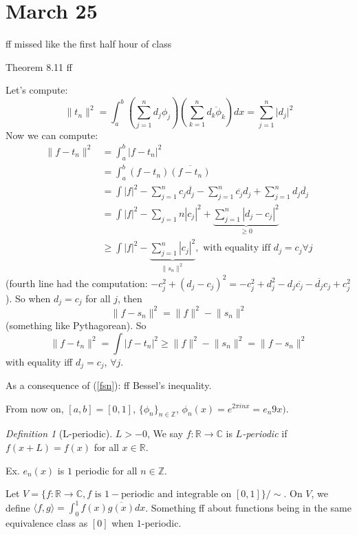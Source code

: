 \documentclass{article}
\theoremstyle{plain}
\theoremstyle{remark}
\newtheorem{definition}{Definition}
\newcommand{\Z}{{\mathbb Z}}
\newcommand{\R}{{\mathbb R}}
\newcommand{\C}{{\mathbb C}}
\begin{document}
\section{March 25}
ff missed like the first half hour of class

Theorem 8.11
ff

Let's compute:
\[
	\lVert t_n \rVert^2 = \int_a^b \left(\sum_{j=1}^n d_j \phi_j\right)
	\left(\sum_{k=1}^n \overline{d_k \phi_k}\right)dx
	= \sum_{j=1}^n \lvert d_j \rvert^2
\]
Now we can compute:
\begin{align*}
	\lVert f - t_n \rVert^2
	&= \int_a^b \lvert f - t_n \rvert^2\\
	&= \int_a^b (f-t_n) \overline{(f-t_n)}\\
	&= \int |f|^2 - \sum_{j=1}^n c_j \overline{d_j} - \sum_{j=1}^n \overline{c_j}d_j
	+ \sum_{j=1}^n d_j \overline{d_j}\\
	&= \int|f|^2 - \sum_{j=1}n |c_j|^2 + \underbrace{\sum_{j=1}^n |d_j - c_j|^2}_{\geq 0}\\
	&\geq \int|f|^2 - \underbrace{\sum_{j=1}^n |c_j|^2}_{\lVert s_n \rVert^2},
	\text{ with equality iff } d_j=c_j \forall j
\end{align*}
(fourth line had the computation:
$-c_j^2 + (d_j - c_j)^2 = -c_j^2 + d_j^2 - d_j\overline{c_j} - \overline{d_j}c_j + c_j^2$).
So when $d_j = c_j$ for all $j$, then
\begin{equation}\label{fsn}
	\lVert f - s_n \rVert^2 = \lVert f \rVert^2 - \lVert s_n \rVert^2
\end{equation}
(something like Pythagorean). So
\[
	\lVert f - t_n \rVert^2 = \int |f-t_n|^2 \geq
	\lVert f \rVert^2 - \lVert s_n \rVert^2 = \lVert f - s_n \rVert^2
\]
with equality iff $d_j = c_j$, $\forall j$.

As a consequence of (\ref{fsn}):
ff Bessel's inequality.

From now on, $[a,b] = [0,1]$, $\{ \phi_n \}_{n \in \Z}$,
$\phi_n(x) = e^{2 \pi i n x} = e_n9x)$.
\begin{definition}[L-periodic]
	$L > -0$, We say $f \colon \R \to \C$ is \emph{$L$-periodic} if
	$f(x + L) = f(x)$ for all $x \in \R$.
\end{definition}
Ex. $e_n(x)$ is $1$ periodic for all $n \in \Z$.

Let $V = \{ f \colon \R \to \C, f \text{ is }1-\text{periodic
and integrable on }[0,1]\}/\sim$.
On $V$, we define $\langle f, g \rangle = \int_0^1 f(x) \overline{g(x)}dx$.
Something ff about functions being in the same equivalence class as $[0]$
when $1$-periodic.
\end{document}
